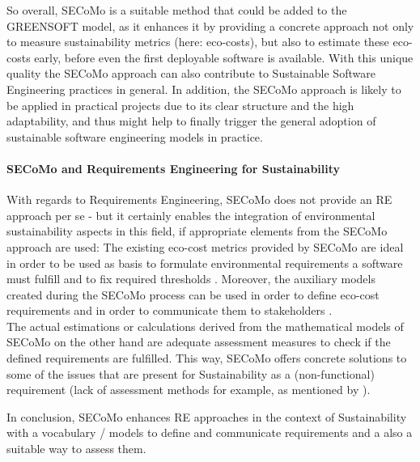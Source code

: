 So overall, SECoMo is a suitable method that could be added to the GREENSOFT model, as it enhances it by providing a concrete approach not only to measure sustainability metrics (here: eco-costs), but also to estimate these eco-costs early, before even the first deployable software is available. With this unique quality the SECoMo approach can also contribute to Sustainable Software Engineering practices in general. %
 In addition, the SECoMo approach is likely to be applied in practical projects due to its clear structure and the high adaptability, and thus might help to finally trigger the general adoption of sustainable software engineering models in practice.


\paragraph{SECoMo and Requirements Engineering for Sustainability}
With regards to Requirements Engineering, SECoMo does not provide an RE approach per se - but it certainly enables the integration of environmental sustainability aspects in this field, if appropriate elements from the SECoMo approach are used: The existing eco-cost metrics provided by SECoMo are ideal in order to be used as basis to formulate environmental requirements a software must fulfill and to fix required thresholds \cite{schulze_cost_2016}. Moreover, the auxiliary models created during the SECoMo process can be used in order to define eco-cost requirements and in order to communicate them to stakeholders \cite{schulze_cost_2016}.\\
The actual estimations or calculations derived from the mathematical models of SECoMo on the other hand are adequate assessment measures to check if the defined requirements are fulfilled. This way, SECoMo offers concrete solutions to some of the issues that are present for Sustainability as a (non-functional) requirement (lack of assessment methods for example, as mentioned by \cite{penzenstadler_safety_2014}).

In conclusion, SECoMo enhances RE approaches in the context of Sustainability with a vocabulary / models to define and communicate requirements and a also a suitable way to assess them.


